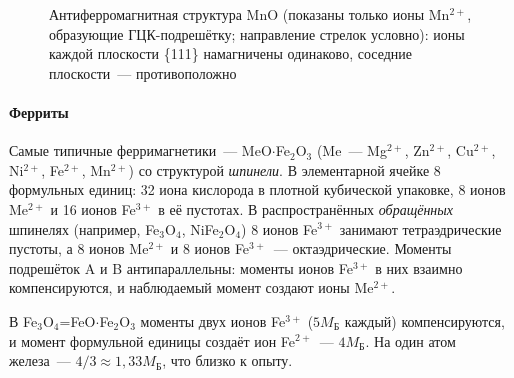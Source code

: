 \begin{figure}[ht]
\centering
{}
\caption{Антиферромагнитная структура MnO (показаны только ионы
Mn$^{2+}$, образующие ГЦК-подрешётку; направление стрелок условно): ионы
каждой плоскости \{111\} намагничены одинаково, соседние плоскости~—
противоположно}
\label{fig:MnO}
\end{figure}

\paragraph{Ферриты}
Самые типичные ферримагнетики~—  MeO$\cdot$Fe$_2$O$_3$ (Me~—
Mg$^{2+}$, Zn$^{2+}$, Cu$^{2+}$, Ni$^{2+}$, Fe$^{2+}$, Mn$^{2+}$) со
структурой \emph{шпинели}. В элементарной ячейке 8 формульных единиц: 32
иона кислорода в плотной кубической упаковке, 8 ионов Me$^{2+}$ и 16 ионов
Fe$^{3+}$ в её пустотах. В распространённых \emph{обращённых} шпинелях
(например, Fe$_3$O$_4$, NiFe$_2$O$_4$) 8 ионов Fe$^{3+}$ занимают
тетраэдрические пустоты, а 8 ионов Me$^{2+}$ и 8 ионов Fe$^{3+}$~—
октаэдрические. Моменты подрешёток A и B антипараллельны:
моменты ионов Fe$^{3+}$ в них взаимно компенсируются, и наблюдаемый момент
создают ионы Me$^{2+}$.

\begin{primer}[Магнетит]
В Fe$_3$O$_4$=FeO$\cdot$Fe$_2$O$_3$ моменты двух ионов Fe$^{3+}$ ($5M_\text{Б}$
каждый) компенсируются, и момент формульной единицы создаёт ион Fe$^{2+}$~—
$4M_\text{Б}$. На один атом железа~— $4/3\approx1{,}33M_\text{Б}$, что близко к
опыту.
\end{primer}

